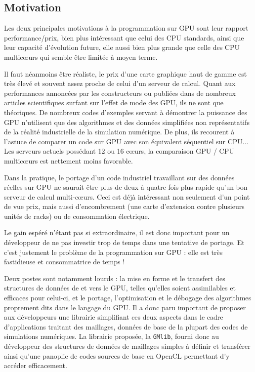\documentclass[a4paper,12pt]{article}
\begin{document}
\subsection{Motivation}
Les deux principales motivations à la programmation sur GPU sont leur rapport performance/prix, bien plus intéressant que celui des CPU standards, ainsi que leur capacité d'évolution future, elle aussi bien plus grande que celle des CPU multic\oe urs qui semble être limitée à moyen terme.

Il faut néanmoins être réaliste, le prix d'une carte graphique haut de gamme est très élevé et souvent assez proche de celui d'un serveur de calcul. Quant aux performances annoncées par les constructeurs ou publiées dans de nombreux articles scientifiques surfant sur l'effet de mode des GPU, ils ne sont que théoriques. De nombreux codes d'exemples servant à démontrer la puissance des GPU n'utilisent que des algorithmes et des données simplifiées non représentatifs de la réalité industrielle de la simulation numérique. De plus, ils recourent à l'astuce de comparer un code sur GPU avec son équivalent séquentiel sur CPU... Les serveurs actuels possédant 12 ou 16 c\oe urs, la comparaison GPU / CPU multic\oe urs est nettement moins favorable.

Dans la pratique, le portage d'un code industriel travaillant sur des données réelles sur GPU ne saurait être plus de deux à quatre fois plus rapide qu'un bon serveur de calcul multi-c\oe urs. Ceci est déjà intéressant non seulement d'un point de vue prix, mais aussi d'encombrement (une carte d'extension contre plusieurs unités de racks) ou de consommation électrique.

Le gain espéré n'étant pas si extraordinaire, il est donc important pour un développeur de ne pas investir trop de temps dans une tentative de portage. Et c'est justement le problème de la programmation sur GPU : elle est très fastidieuse et consommatrice de temps !

Deux postes sont notamment lourds : la mise en forme et le transfert des structures de données de et vers le GPU, telles qu'elles soient assimilables et efficaces pour celui-ci, et le portage, l'optimisation et le débogage des algorithmes proprement dits dans le langage du GPU.
Il a donc paru important de proposer aux développeurs une librairie simplifiant ces deux aspects dans le cadre d'applications traitant des maillages, données de base de la plupart des codes de simulations numériques. La librairie proposée, la {\tt GMlib}, fourni donc au développeur des structures de données de maillages simples à définir et transférer ainsi qu'une panoplie de codes sources de base en OpenCL permettant d'y accéder efficacement.
\end{document}
